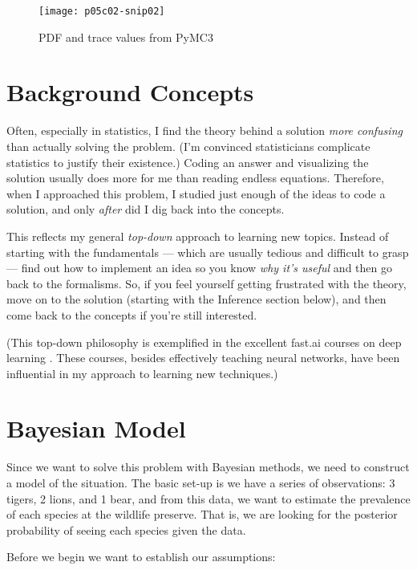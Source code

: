     \begin{figure*}[h]
        \texttt{[image: p05c02-snip02]}
        \caption{PDF and trace values from PyMC3}
        \label{fig:p05c02-snip02}
        \end{figure*}
    
\section{Background Concepts}

Often, especially in statistics, I find the theory behind a solution \textit{more confusing} than actually solving the problem. (I'm convinced statisticians complicate statistics to justify their existence.) Coding an answer and visualizing the solution usually does more for me than reading endless equations. Therefore, when I approached this problem, I studied just enough of the ideas to code a solution, and only \textit{after} did I dig back into the concepts.

This reflects my general \textit{top-down} \cite{RachelThomas2019} approach to learning new topics. Instead of starting with the fundamentals --- which are usually tedious and difficult to grasp --- find out how to implement an idea so you know \textit{why it's useful} and then go back to the formalisms. So, if you feel yourself getting frustrated with the theory, move on to the solution (starting with the Inference section below), and then come back to the concepts if you're still interested.

(This top-down philosophy is exemplified in the excellent fast.ai courses on deep learning \cite{RachelThomas2019}. These courses, besides effectively teaching neural networks, have been influential in my approach to learning new techniques.)

\section{Bayesian Model}

Since we want to solve this problem with Bayesian methods, we need to construct a model of the situation. The basic set-up is we have a series of observations: 3 tigers, 2 lions, and 1 bear, and from this data, we want to estimate the prevalence of each species at the wildlife preserve. That is, we are looking for the posterior probability of seeing each species given the data.

Before we begin we want to establish our assumptions:


